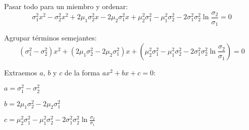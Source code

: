 \documentclass[24pt]{article}
\newcommand{\paren}[1]{\left( #1 \right)}
\begin{document}
	Pasar todo para un miembro y ordenar:
	\[
		\sigma_1^2 x^2
		-  \sigma_2^2 x^2
		+2\mu_1\sigma_2^2 x
		-2\mu_2 \sigma_1^2 x
		+\mu_2^2 \sigma_1^2
		-\mu_1^2\sigma_2^2
		-2\sigma_1^2\sigma_2^2\ln\frac{\sigma_2}{\sigma_1}
		=0
	\]

	Agrupar términos semejantes:
	\[
		(\sigma_1^2-  \sigma_2^2) x^2
		+
		(2\mu_1\sigma_2^2-2\mu_2 \sigma_1^2 )x
		+
		\paren{
			\mu_2^2 \sigma_1^2
			-\mu_1^2\sigma_2^2
			-2\sigma_1^2\sigma_2^2\ln\frac{\sigma_2}{\sigma_1}
		}
		=0
	\]

	Extraemos $a$, $b$ y $c$ de la forma $ax^2+bx+c=0$:

	$a=\sigma_1^2-  \sigma_2^2$

	$b=2\mu_1\sigma_2^2-2\mu_2 \sigma_1^2$

	$c=\mu_2^2 \sigma_1^2 -\mu_1^2\sigma_2^2-2\sigma_1^2\sigma_2^2\ln\frac{\sigma_2}{\sigma_1}$
\end{document}
